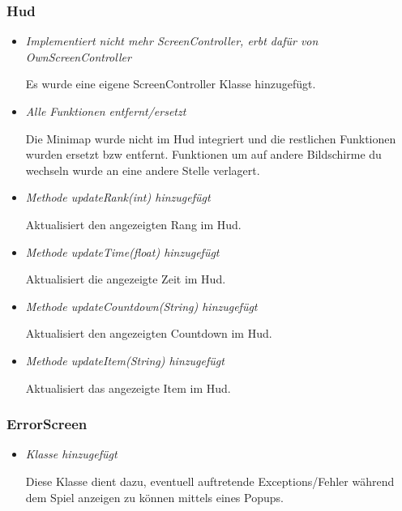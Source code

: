 \subsubsection{Hud}
\begin{itemize}
    \item \textit{Implementiert nicht mehr ScreenController, erbt dafür von OwnScreenController}
        \begin{leftbar}[0.9\linewidth]
            Es wurde eine eigene ScreenController Klasse hinzugefügt.
        \end{leftbar}
    \item \textit{Alle Funktionen entfernt/ersetzt}
        \begin{leftbar}[0.9\linewidth]
            Die Minimap wurde nicht im Hud integriert und die restlichen Funktionen wurden 
            ersetzt bzw entfernt. Funktionen um auf andere Bildschirme du wechseln wurde an 
            eine andere Stelle verlagert.
        \end{leftbar}
    \pagebreak
    \item \textit{Methode updateRank(int) hinzugefügt}
        \begin{leftbar}[0.9\linewidth]
            Aktualisiert den angezeigten Rang im Hud.
        \end{leftbar}
    \item \textit{Methode updateTime(float) hinzugefügt}
        \begin{leftbar}[0.9\linewidth]
            Aktualisiert die angezeigte Zeit im Hud.
        \end{leftbar}
    \item \textit{Methode updateCountdown(String) hinzugefügt}
        \begin{leftbar}[0.9\linewidth]
            Aktualisiert den angezeigten Countdown im Hud.
        \end{leftbar}
    \item \textit{Methode updateItem(String) hinzugefügt}
        \begin{leftbar}[0.9\linewidth]
            Aktualisiert das angezeigte Item im Hud.
        \end{leftbar}
\end{itemize}

\subsubsection{ErrorScreen}
\begin{itemize}
    \item \textit{Klasse hinzugefügt}
        \begin{leftbar}[0.9\linewidth]
            Diese Klasse dient dazu, eventuell auftretende Exceptions/Fehler während dem Spiel 
            anzeigen zu können mittels eines Popups.
        \end{leftbar}
\end{itemize}

